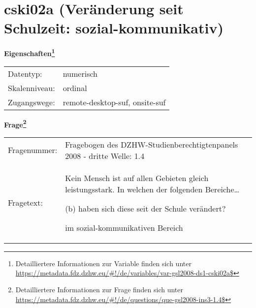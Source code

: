 
    \setcounter{footnote}{0}

    \vspace*{-1.8cm}
	\section{cski02a (Veränderung seit Schulzeit: sozial-kommunikativ)}
	\label{section:cski02a}



    \vspace*{0.5cm}
    \noindent\textbf{Eigenschaften\footnote{Detailliertere Informationen zur Variable finden sich unter
		\url{https://metadata.fdz.dzhw.eu/\#!/de/variables/var-gsl2008-ds1-cski02a$}}}\\
	\begin{tabularx}{\hsize}{@{}lX}
	Datentyp: & numerisch \\
	Skalenniveau: & ordinal \\
	Zugangswege: &
	  remote-desktop-suf, 
	  onsite-suf
 \\
    \end{tabularx}



				\vspace*{0.5cm}
                \noindent\textbf{Frage\footnote{Detailliertere Informationen zur Frage finden sich unter
		              \url{https://metadata.fdz.dzhw.eu/\#!/de/questions/que-gsl2008-ins3-1.4$}}}\\
				\begin{tabularx}{\hsize}{@{}lX}
					Fragenummer: &
					  Fragebogen des DZHW-Studienberechtigtenpanels 2008 - dritte Welle:
					  1.4
 \\
					Fragetext: & Kein Mensch ist auf allen Gebieten gleich leistungsstark. In welchen der folgenden Bereiche…\par  (b) haben sich diese seit der Schule verändert?\par  im sozial-kommunikativen Bereich \\
				\end{tabularx}





